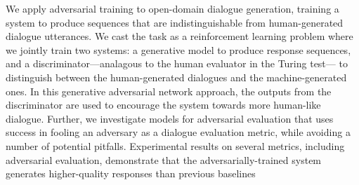We apply adversarial training to open-domain dialogue generation, training a system to produce sequences that are indistinguishable from human-generated dialogue utterances. We cast the task as a reinforcement learning problem where we jointly train two systems: a generative model to produce response sequences, and a discriminator---analagous to the human evaluator in the Turing test--- to distinguish between the human-generated dialogues and the machine-generated ones. In this generative adversarial network approach, the outputs from the discriminator are used to encourage the system towards more human-like dialogue. Further, we investigate models for adversarial  evaluation that uses success in fooling an adversary as a dialogue evaluation metric, while avoiding a number of potential pitfalls. Experimental results on several metrics, including adversarial evaluation, demonstrate that the adversarially-trained system generates higher-quality responses than previous baselines
